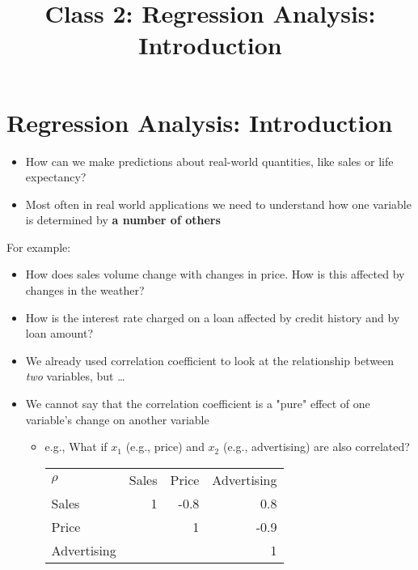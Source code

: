 \documentclass[10pt,article]{article}
\date{\vspace{-6ex}}
\title{Class 2: Regression Analysis: Introduction}
\begin{document}
\maketitle
{} 
\thispagestyle{fancy}

\setcounter{tocdepth}{1}
\tableofcontents
\vspace{6ex}

\section{Regression Analysis: Introduction}
\label{sec:orgf4bc218}
\begin{itemize}
\item How can we make predictions about real-world quantities, like sales or life
expectancy?
\item Most often in real world applications we need to understand how one variable
is determined by \textbf{a number of others}
\end{itemize}

For example:

\begin{itemize}
\item How does sales volume change with changes in price. How is this affected by
changes in the weather?
\item How is the interest rate charged on a loan affected by credit history and by
loan amount?
\end{itemize}

\begin{itemize}
\item We already used correlation coefficient to look at the relationship between 
\emph{two} variables, but \ldots{}
\item We cannot say that the correlation coefficient is a "pure" effect of
one variable's change on another variable

\begin{itemize}
\item e.g., What if \(x_{1}\) (e.g., price) and \(x_{2}\) (e.g., advertising) are also correlated?

\begin{center}
\begin{tabular}{lrrr}
\(\rho\) & Sales & Price & Advertising\\
Sales & 1 & -0.8 & 0.8\\
Price &  & 1 & -0.9\\
Advertising &  &  & 1\\
\end{tabular}
\end{center}
\end{itemize}
\end{itemize}
\end{document}
